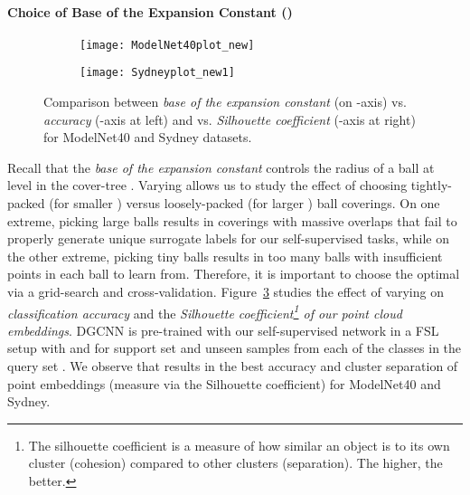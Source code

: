 \documentclass{article}
\begin{document}
\paragraph{Choice of Base of the Expansion Constant ()}
\begin{figure}[tbp]
\centering
	\begin{subfigure}{.5\textwidth}
		\centering
		\texttt{[image: ModelNet40plot\_new]}
		\label{fig:sub1}
	\end{subfigure}\begin{subfigure}{.5\textwidth}
		\centering
		\texttt{[image: Sydneyplot\_new1]}
		\label{fig:sub2}
	\end{subfigure}
	\caption{Comparison between 
		\emph{base of the expansion constant } (on -axis) vs. \emph{accuracy} (-axis at left) and vs. \emph{Silhouette coefficient} (-axis at right) for ModelNet40 and Sydney datasets.}
	\label{fig:density}
\end{figure}
Recall that the \emph{base of the expansion constant } controls the radius  of a ball at level  in the cover-tree . Varying  allows us to study the effect of choosing tightly-packed (for smaller ) versus loosely-packed (for larger ) ball coverings. 
On one extreme, picking large balls results in coverings with massive overlaps that fail to properly generate unique surrogate labels for our self-supervised tasks, while on the other extreme, picking tiny balls results in too many balls with insufficient points in each ball to learn from.
Therefore, it is important to choose the optimal  via a grid-search and cross-validation.
Figure~\ref{fig:density} studies the effect of varying  on \emph{classification accuracy} and the \emph{Silhouette coefficient\footnote{The silhouette coefficient is a measure of how similar an object is to its own cluster (cohesion) compared to other clusters (separation). The higher, the better.} of our point cloud embeddings}. DGCNN is pre-trained with our self-supervised network in a FSL setup with  and  for support set  and  unseen samples from each of the  classes in the query set .
We observe that  results in the best accuracy and cluster separation of point embeddings (measure via the Silhouette coefficient) for ModelNet40 and Sydney.
\end{document}
